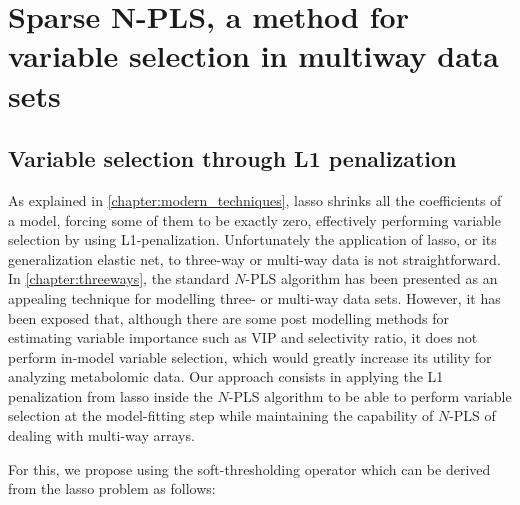 
\chapter[Sparse N-PLS, a method for variable selection in multiway data sets]{Sparse N-PLS, a method for variable selection in multiway data sets}



\section{Variable selection through L1 penalization}
As explained in \autoref{chapter:modern_techniques}, lasso shrinks all the coefficients of a model, forcing some of them to be exactly zero, effectively performing variable selection by using L1-penalization. Unfortunately the application of lasso, or its generalization elastic net, to three-way or multi-way data is not straightforward. In \autoref{chapter:threeways}, the standard $N$-PLS algorithm has been presented as an appealing technique for modelling three- or multi-way data sets. However, it has been exposed that, although there are some post modelling methods for estimating variable importance such as VIP and selectivity ratio, it does not perform in-model variable selection, which would greatly increase its utility for analyzing metabolomic data. Our approach consists in applying the L1 penalization from lasso inside the $N$-PLS algorithm to be able to perform variable selection at the model-fitting step while maintaining the capability of $N$-PLS of dealing with multi-way arrays. 

For this, we propose using the soft-thresholding operator which can be derived from the lasso problem as follows:

